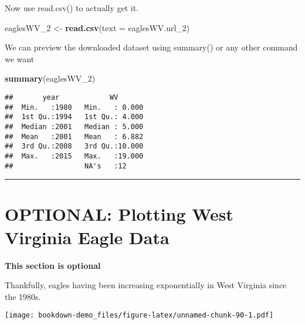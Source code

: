 \documentclass[]{book}
\newenvironment{Shaded}{\begin{snugshade}}{\end{snugshade}}
\newcommand{\KeywordTok}[1]{\textcolor[rgb]{0.13,0.29,0.53}{\textbf{#1}}}
\newcommand{\DataTypeTok}[1]{\textcolor[rgb]{0.13,0.29,0.53}{#1}}
\newcommand{\DecValTok}[1]{\textcolor[rgb]{0.00,0.00,0.81}{#1}}
\newcommand{\StringTok}[1]{\textcolor[rgb]{0.31,0.60,0.02}{#1}}
\newcommand{\OperatorTok}[1]{\textcolor[rgb]{0.81,0.36,0.00}{\textbf{#1}}}
\newcommand{\NormalTok}[1]{#1}
\theoremstyle{definition}
\theoremstyle{definition}
\theoremstyle{definition}
\theoremstyle{remark}
\begin{document}
Now use read.csv() to actually get it.

\begin{Shaded}
\begin{Highlighting}[]
\NormalTok{eaglesWV_}\DecValTok{2}\NormalTok{ <-}\StringTok{ }\KeywordTok{read.csv}\NormalTok{(}\DataTypeTok{text =}\NormalTok{ eaglesWV.url_}\DecValTok{2}\NormalTok{)}
\end{Highlighting}
\end{Shaded}

We can preview the downloaded dataset using summary() or any other
command we want

\begin{Shaded}
\begin{Highlighting}[]
\KeywordTok{summary}\NormalTok{(eaglesWV_}\DecValTok{2}\NormalTok{)}
\end{Highlighting}
\end{Shaded}

\begin{verbatim}
##       year            WV        
##  Min.   :1980   Min.   : 0.000  
##  1st Qu.:1994   1st Qu.: 4.000  
##  Median :2001   Median : 5.000  
##  Mean   :2001   Mean   : 6.882  
##  3rd Qu.:2008   3rd Qu.:10.000  
##  Max.   :2015   Max.   :19.000  
##                 NA's   :12
\end{verbatim}

\begin{center}\rule{0.5\linewidth}{\linethickness}\end{center}

\section{OPTIONAL: Plotting West Virginia Eagle
Data}\label{optional-plotting-west-virginia-eagle-data}

\textbf{This section is optional}

Thankfully, eagles having been increasing exponentially in West Virginia
since the 1980s.

\begin{Shaded}
\end{Shaded}

\texttt{[image: bookdown-demo\_files/figure-latex/unnamed-chunk-90-1.pdf]}
\end{document}
